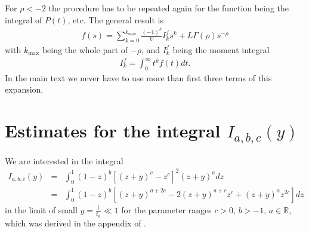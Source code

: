 For $\rho < -2$ the procedure has to be repeated again for the function being the integral of $P(t)$, etc. The general result is
%
\begin{align}
 f(s) = \sum_{k=0}^{k_{\max}} \frac{(-1)^k}{k!} I^{f}_k s^k + L \Gamma(\rho) s^{-\rho}
\end{align}
%
with $k_{\max}$ being the whole part of $-\rho$, and $I^{f}_k$ being the moment integral
\begin{align}
I^{f}_k = \int_0^\infty t^k f(t) dt.
\end{align}
In the main text we never have to use more than first three terms of this expansion. 


\chapter{Estimates for the integral $I_{a,b,c}(y)$ \label{sec:integral}} 

We are interested in the integral 
%
\begin{eqnarray}
I_{a,b,c}(y) &=& \int^{1}_0 (1-z)^{b} [(z+y)^c-z^c]^2 (z+y)^{a}  dz \label{eqn:Iabc1} \\ 
&=& \int^{1}_0 (1-z)^{b} \left[ (z+y)^{a+2c} -2 (z+y)^{a+c} z^{c}  + (z+y)^{a} z^{2c}\right] dz \nonumber 
\end{eqnarray}
%
in the limit of small $y= \frac{t}{t_a} \ll 1$ for the parameter ranges $c > 0$, $b > -1$, $a \in \mathbb{R}$, which was derived in the appendix of \cite{bothe}.

